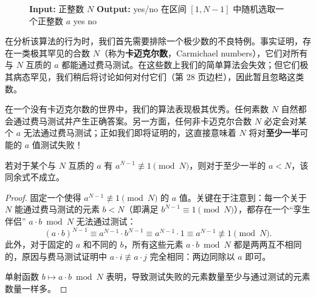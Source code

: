 \begin{figure}[htbp]
\centering
\begin{tcolorbox}[colback=white,colframe=gray!50!black,title={\textbf{图 1.7}\quad 素性测试算法 (基础版)}]
\begin{algorithmic}[1]
    \State \textbf{Input:} 正整数 $N$
    \State \textbf{Output:} yes/no
    \State 在区间 $[1, N-1]$ 中随机选取一个正整数 $a$
        \State \Return yes
    \Else
        \State \Return no
    \EndIf
\EndFunction
\end{algorithmic}
\end{tcolorbox}
\label{fig:primality_basic}
\end{figure}

在分析该算法的行为时，我们首先需要排除一个极少数的不良特例。事实证明，存在一类极其罕见的合数 $N$（称为\textbf{卡迈克尔数}，Carmichael numbers），它们对所有与 $N$ 互质的 $a$ 都能通过费马测试。在这些数上我们的简单算法会失效；但它们极其病态罕见，我们稍后将讨论如何对付它们（第 28 页边栏），因此暂且忽略这类数。

在一个没有卡迈克尔数的世界中，我们的算法表现极其优秀。任何素数 $N$ 自然都会通过费马测试并产生正确答案。另一方面，任何非卡迈克尔合数 $N$ 必定会对某个 $a$ 无法通过费马测试；正如我们即将证明的，这直接意味着 $N$ 将对\textbf{至少一半}可能的 $a$ 值测试失败！

\begin{lemma}
若对于某个与 $N$ 互质的 $a$ 有 $a^{N-1} \not\equiv 1 \pmod N$，则对于至少一半的 $a < N$，该同余式不成立。
\end{lemma}

\begin{proof}
固定一个使得 $a^{N-1} \not\equiv 1 \pmod N$ 的 $a$ 值。关键在于注意到：每一个关于 $N$ 能通过费马测试的元素 $b < N$（即满足 $b^{N-1} \equiv 1 \pmod N$），都存在一个“孪生伴侣” $a \cdot b \bmod N$ 无法通过测试：
\[
(a \cdot b)^{N-1} \equiv a^{N-1} \cdot b^{N-1} \equiv a^{N-1} \cdot 1 \equiv a^{N-1} \not\equiv 1 \pmod N.
\]
此外，对于固定的 $a$ 和不同的 $b$，所有这些元素 $a \cdot b \bmod N$ 都是两两互不相同的，原因与费马测试证明中 $a \cdot i \not\equiv a \cdot j$ 完全相同：两边同除以 $a$ 即可。

\begin{center}
\end{center}

单射函数 $b \mapsto a \cdot b \bmod N$ 表明，导致测试失败的元素数量至少与通过测试的元素数量一样多。
\end{proof}

